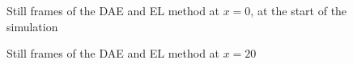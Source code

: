\documentclass{article}
\begin{document}
\begin{center}
	\begin{figure}[H]
		\centering
		
		\caption{Still frames of the DAE and EL method at $x=0$, at the start of the simulation}%
		\label{fig:example3}%
	\end{figure}
\end{center}


\begin{center}
	\begin{figure}[H]
		\centering
		
		\caption{Still frames of the DAE and EL method at $x=20$}%
		\label{fig:example4}%
	\end{figure}
\end{center}
\end{document}
